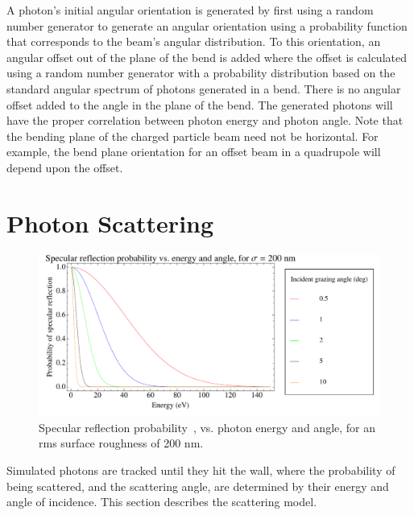 \documentclass[11pt,openany]{report}
\begin{document}
A photon's initial angular orientation is generated by first using a
random number generator to generate an angular orientation using a
probability function that corresponds to the beam's angular
distribution. To this orientation, an angular offset out of the plane
of the bend is added where the offset is calculated using a random
number generator with a probability distribution based on the standard
angular spectrum of photons generated in a bend. There is no angular
offset added to the angle in the plane of the bend. The generated
photons will have the proper correlation between photon energy and
photon angle. Note that the bending plane of the charged particle beam
need not be horizontal. For example, the bend plane orientation for an
offset beam in a quadrupole will depend upon the offset.

\section{Photon Scattering} 

  \begin{figure}
  \centering
  \includegraphics[width=6in]{specular-probability.pdf}
  \caption[Specular reflection probability vs. photon energy and angle]
{\label{f:spec.prob}
Specular reflection probability~\cite{b:beckmann}, vs. photon energy
and angle, for an rms surface roughness of 200 nm.}
  \end{figure}
   
Simulated photons are tracked until they hit the wall, where the
probability of being scattered, and the scattering angle, are
determined by their energy and angle of incidence.  This section
describes the scattering model.
\end{document}
